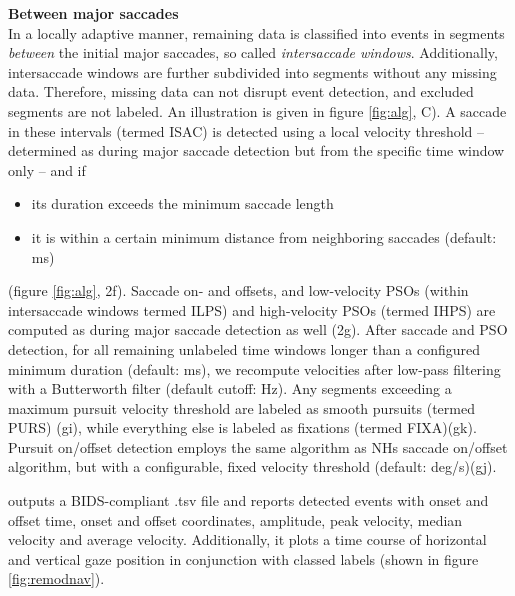\textbf{Between major saccades}\\
In a locally adaptive manner, remaining data is classified into events in segments
\textit{between} the initial major saccades, so called \textit{intersaccade windows}. Additionally, intersaccade
windows are further subdivided into segments without any missing data. Therefore, missing data can not disrupt event
detection, and excluded segments are not labeled. An illustration is given in figure \ref{fig:alg}, C). A saccade
in these intervals (termed ISAC) is detected using a local velocity threshold -- determined as during major
saccade detection but from the specific time window only -- and if
\begin{itemize}
    \item its duration exceeds the minimum saccade length
    \item it is within a certain minimum distance from neighboring saccades (default: \unit[130]{ms})
\end{itemize}
(figure \ref{fig:alg}, 2f). Saccade on- and offsets, and low-velocity PSOs (within intersaccade
windows termed ILPS) and high-velocity PSOs (termed IHPS) are computed as during major saccade detection as well
(2g). After saccade and PSO detection, for all remaining unlabeled time windows longer than a configured minimum
duration (default: \unit[40]{ms}), we recompute velocities after low-pass filtering with a Butterworth filter
(default  cutoff: \unit[4]{Hz}). Any segments exceeding a maximum pursuit velocity threshold are labeled as
smooth pursuits  (termed PURS) (gi), while everything else is labeled as fixations (termed FIXA)(gk). Pursuit
on/offset detection  employs the same algorithm as NHs saccade on/offset algorithm, but with a configurable,
fixed velocity threshold (default: \unit[2]{deg/s})(gj).

\remodnav outputs a BIDS-compliant \citep{gorgolewski2016brain} .tsv file and
reports detected events with onset and offset time, onset and offset coordinates, amplitude, peak velocity, median
velocity and average velocity. Additionally, it plots a time course of horizontal and vertical gaze position in
conjunction with classed labels (shown in figure \ref{fig:remodnav}).





